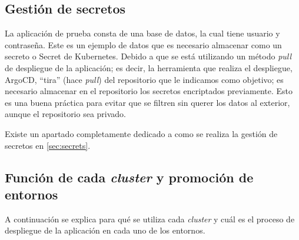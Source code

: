 \subsection*{Gestión de secretos}
\label{subsec:secretos}

La aplicación de prueba consta de una base de datos, la cual tiene usuario y contraseña. Este es un ejemplo de datos que es necesario almacenar como un secreto o Secret de Kubernetes. Debido a que se está utilizando un método \textit{pull}\cite{pull} de despliegue de la aplicación; es decir, la herramienta que realiza el despliegue, ArgoCD, ``tira'' (hace \textit{pull}) del repositorio que le indicamos como objetivo; es necesario almacenar en el repositorio los secretos encriptados previamente. Esto es una buena práctica para evitar que se filtren sin querer los datos al exterior, aunque el repositorio sea privado.

Existe un apartado completamente dedicado a como se realiza la gestión de secretos en \ref{sec:secrets}. 

\subsection*{Función de cada \textit{cluster} y promoción de entornos}
\label{subsec:cluster-func}

A continuación se explica para qué se utiliza cada \textit{cluster} y cuál es el proceso de despliegue de la aplicación en cada uno de los entornos.

